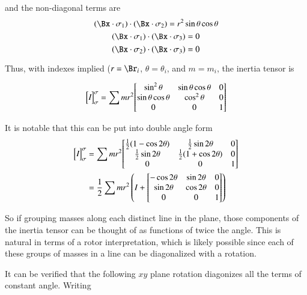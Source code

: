 \documentclass{article}      %
\newcommand{\matrixoftx}[3]{
{
\begin{bmatrix}
{#1}
\end{bmatrix}
}_{#2}^{#3}
}
\begin{document}
and the non-diagonal terms are
\[
(\Bx \cdot \sigma_1) \cdot (\Bx \cdot \sigma_2) = r^2 \sin\theta \cos\theta
\]
\[
(\Bx \cdot \sigma_1) \cdot (\Bx \cdot \sigma_3) = 0
\]
\[
(\Bx \cdot \sigma_2) \cdot (\Bx \cdot \sigma_3) = 0
\]

Thus, with indexes implied ($r=\Br_i$, $\theta = \theta_i$, and $m = m_i$, the inertia tensor is

\begin{align*}
\matrixoftx{\emph{I}}{\sigma}{\sigma}
&= 
\sum m r^2
{
\begin{bmatrix}
\sin^2 \theta  & \sin\theta \cos \theta & 0 \\
\sin\theta \cos \theta & \cos^2 \theta & 0 \\
0 & 0 & 1 \\
\end{bmatrix}
} \\
\end{align*}

It is notable that this can be put into double angle form
\begin{align*}
\matrixoftx{\emph{I}}{\sigma}{\sigma}
&=
\sum 
m r^2
{
\begin{bmatrix}
\frac{1}{2} (1 - \cos 2\theta)    &   \frac{1}{2} \sin 2\theta      &     0 \\
\frac{1}{2} \sin 2\theta      &     \frac{1}{2}(1 + \cos 2\theta)    &    0 \\
0 & 0 & 1 \\
\end{bmatrix}
} \\
&=
\frac{1}{2} 
\sum 
m r^2
\left(
I + 
{
\begin{bmatrix}
- \cos 2\theta    &    \sin 2\theta     &    0 \\
\sin 2\theta      &     \cos 2\theta    &    0 \\
0 & 0 & 1 \\
\end{bmatrix}
}
\right) \\
\end{align*}

So if grouping masses along each distinct line in the plane, those components of the inertia tensor can be thought of as 
functions of twice the angle.  This is natural in terms of a rotor interpretation, which is likely possible since each of
these groups of masses in a line can be diagonalized with a rotation.

It can be verified that the following $xy$ plane rotation diagonizes all the terms of constant angle.  Writing
\end{document}
